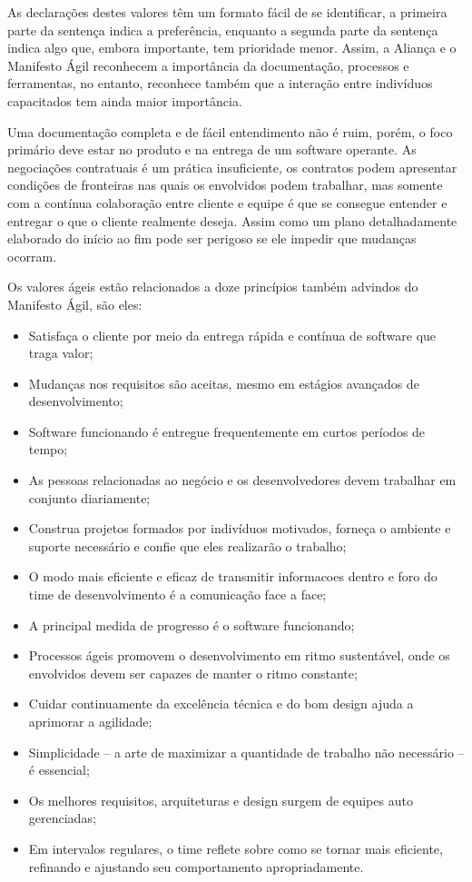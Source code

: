 As declarações destes valores têm um formato fácil de se identificar, a primeira parte da sentença indica a preferência, enquanto a segunda parte da sentença indica algo que, embora importante, tem prioridade menor. Assim, a Aliança e o Manifesto Ágil reconhecem a importância da documentação, processos e ferramentas, no entanto, reconhece também que a interação entre indivíduos capacitados tem ainda maior importância.

Uma documentação completa e de fácil entendimento não é ruim, porém, o foco primário deve estar no produto e na entrega de um software operante. As negociações contratuais é um prática insuficiente, os contratos podem apresentar condições de fronteiras nas quais os envolvidos podem trabalhar, mas somente com a contínua colaboração entre cliente e equipe é que se consegue entender e entregar o que o cliente realmente deseja. Assim como um plano detalhadamente elaborado do início ao fim pode ser perigoso se ele impedir que mudanças ocorram.

Os valores ágeis estão relacionados a doze princípios também advindos do Manifesto Ágil, são eles:
\begin{itemize}
\item Satisfaça o cliente por meio da entrega rápida e contínua de software que traga valor;
\item Mudanças nos requisitos são aceitas, mesmo em estágios avançados de desenvolvimento;
\item Software funcionando é entregue frequentemente em curtos períodos de tempo;
\item As pessoas relacionadas ao negócio e os desenvolvedores devem trabalhar em conjunto diariamente;
\item Construa projetos formados por indivíduos motivados, forneça o ambiente e suporte necessário e confie que eles realizarão o trabalho;
\item O modo mais eficiente e eficaz de transmitir informacoes dentro e foro do time de desenvolvimento é a comunicação face a face;
\item A principal medida de progresso é o software funcionando;
\item Processos ágeis promovem o desenvolvimento em ritmo sustentável, onde os envolvidos devem ser capazes de manter o ritmo constante;
\item Cuidar continuamente da excelência técnica e do bom design ajuda a aprimorar a agilidade;
\item Simplicidade – a arte de maximizar a quantidade de trabalho não necessário – é essencial;
\item Os melhores requisitos, arquiteturas e design surgem de equipes auto gerenciadas;
\item Em intervalos regulares, o time reflete sobre como se tornar mais eficiente, refinando e ajustando seu comportamento apropriadamente.
\end{itemize}

